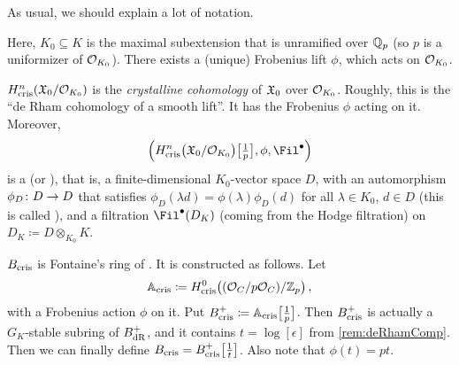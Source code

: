 \begin{rem}
	As usual, we should explain a lot of notation.
	\begin{numerate}
		\item Here, $K_0\subseteq K$ is the maximal subextension that is unramified over $\mathbb{Q}_p$ (so $p$ is a uniformizer of $\mathcal{O}_{K_0}$). There exists a (unique) Frobenius lift $\phi$, which acts on $\mathcal{O}_{K_0}$.
		\item $H_{\mathrm{cris}}^n(\mathfrak{X}_0/\mathcal{O}_{K_0})$ is the \emph{crystalline cohomology} of $\mathfrak{X}_0$ over $\mathcal{O}_{K_0}$. Roughly, this is the \enquote{de Rham cohomology of a smooth lift}. It has the Frobenius $\phi$ acting on it. Moreover,
		\begin{equation*}
			\Big(H_\cris^n\big(\XX_0/\Oo_{K_0}\big)\big[\textstyle\frac 1p\big], \phi, \Fil^\bullet\Big)
		\end{equation*}
		is a  (or ), that is, a finite-dimensional $K_0$-vector space $D$, with an automorphism $\phi_D\colon D\morphism D$ that satisfies $\phi_D(\lambda d)=\phi(\lambda)\phi_D(d)$ for all $\lambda\in K_0$, $d\in D$ (this is called ), and a filtration $\Fil^\bullet(D_K)$ (coming from the Hodge filtration) on $D_K\coloneqq D\otimes_{K_0}K$.
		\item $B_{\mathrm{cris}}$ is Fontaine's ring of . It is constructed as follows. Let
		\begin{equation*}
			\mathbb{A}_{\mathrm{cris}}\coloneqq H_{\mathrm{cris}}^0\big((\mathcal{O}_C/p\mathcal{O}_C)/\mathbb{Z}_p\big)\,,
		\end{equation*}
		with a Frobenius action $\phi$ on it. Put $B_{\mathrm{cris}}^+\coloneqq \mathbb{A}_{\mathrm{cris}}\big[\frac1p\big]$. Then $B_{\mathrm{cris}}^+$ is actually a $G_K$-stable subring of $B_{\mathrm{dR}}^+$, and it contains $t=\log{}[\epsilon]$ from \cref{rem:deRhamComp}. Then we can finally define $B_{\mathrm{cris}}=B_{\mathrm{cris}}^+\big[\frac1t\big]$. Also note that $\phi(t)=pt$.
		

\end{numerate}
\end{rem}
